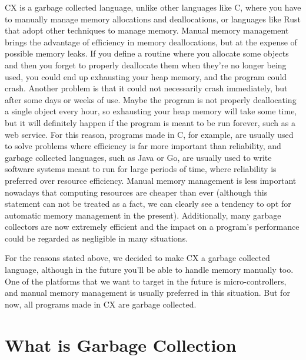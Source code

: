 \documentclass[11pt,fleqn,openany]{book} %
\begin{document}
CX is a garbage collected language, unlike other languages like C, where you have to manually manage memory allocations and deallocations, or languages like Rust that adopt other techniques to manage memory. Manual memory management brings the advantage of efficiency in memory deallocations, but at the expense of possible memory leaks. If you define a routine where you allocate some objects and then you forget to properly deallocate them when they're no longer being used, you could end up exhausting your heap memory, and the program could crash. Another problem is that it could not necessarily crash immediately, but after some days or weeks of use. Maybe the program is not properly deallocating a single object every hour, so exhausting your heap memory will take some time, but it will definitely happen if the program is meant to be run forever, such as a web service. For this reason, programs made in C, for example, are usually used to solve problems where efficiency is far more important than reliability, and garbage collected languages, such as Java or Go, are usually used to write software systems meant to run for large periods of time, where reliability is preferred over resource efficiency. Manual memory management is less important nowadays that computing resources are cheaper than ever (although this statement can not be treated as a fact, we can clearly see a tendency to opt for automatic memory management in the present). Additionally, many garbage collectors are now extremely efficient and the impact on a program's performance could be regarded as negligible in many situations.

For the reasons stated above, we decided to make CX a garbage collected language, although in the future you'll be able to handle memory manually too. One of the platforms that we want to target in the future is micro-controllers, and manual memory management is usually preferred in this situation. But for now, all programs made in CX are garbage collected.

\section{What is Garbage Collection}
\end{document}

